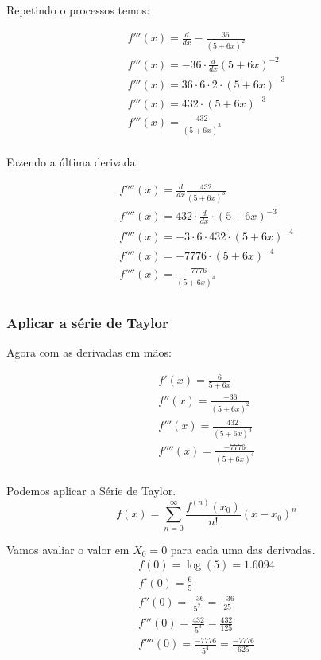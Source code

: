 Repetindo o processos temos:

\[
    \begin{aligned}
        f'''(x) = \frac{d}{dx} -\frac{36}{(5 + 6x)^{2}} \\
        f'''(x) = - 36 \cdot \frac{d}{dx} (5 + 6x)^{-2} \\
        f'''(x) = 36 \cdot 6 \cdot 2 \cdot (5 + 6x)^{-3} \\
        f'''(x) = 432 \cdot (5 + 6x)^{-3} \\
        f'''(x) = \frac{432}{ (5 + 6x)^{3} } \\
    \end{aligned}
\]

Fazendo a última derivada:

\[
    \begin{aligned}
        f''''(x) =\frac{d}{dx} \frac{432}{ (5 + 6x)^{3} }\\
        f''''(x) = 432 \cdot \frac{d}{dx} \cdot (5 + 6x)^{-3}\\
        f''''(x) = -3 \cdot 6 \cdot 432 \cdot (5 + 6x)^{-4}\\
        f''''(x) = -7776 \cdot (5 + 6x)^{-4}\\
        f''''(x) = \frac{-7776}{(5 + 6x)^{4}}\\
    \end{aligned}
\]

\subsubsection{Aplicar a série de Taylor}

Agora com as derivadas em mãos:

\[
    \begin{aligned}
        f'(x) =    \frac{6}{5 + 6x} \\
        f''(x) =   \frac{-36}{ (5 + 6x)^{2} } \\
        f'''(x) =  \frac{432}{ (5 + 6x)^{3} } \\
        f''''(x) = \frac{-7776}{(5 + 6x)^{4}}\\
    \end{aligned}
\]

Podemos aplicar a Série de Taylor.
\[
    f(x) = \sum_{n=0}^{\infty} \frac{f^{(n)}(x_0)}{n!}(x - x_0)^n
\]

Vamos avaliar o valor em $X_0 = 0$ para cada uma das derivadas.
    \begin{gather*}
        f(0) =    \log(5) = 1.6094 \\
        f'(0) =    \frac{6}{5} \\
        f''(0) =   \frac{-36}{5^{2}}  = \frac{-36}{25} \\
        f'''(0) =  \frac{432}{5^{3}}  = \frac{432}{125} \\
        f''''(0) = \frac{-7776}{5^{4}} = \frac{-7776}{625} \\
    \end{gather*}

